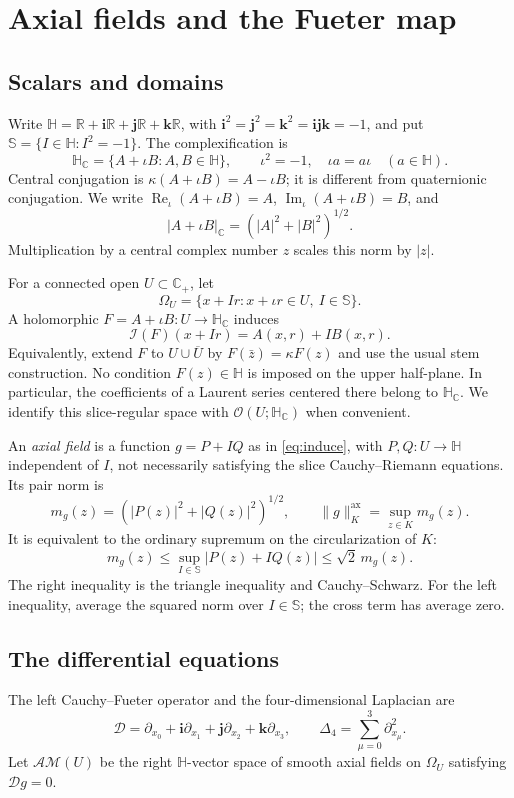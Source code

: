 \documentclass[11pt,a4paper]{article}
\numberwithin{equation}{section}
\theoremstyle{definition}
\theoremstyle{remark}
\newcommand{\R}{\mathbb R}
\newcommand{\C}{\mathbb C}
\newcommand{\HH}{\mathbb H}
\newcommand{\HC}{\mathbb H_{\C}}
\newcommand{\Sp}{\mathbb S}
\newcommand{\Cp}{\C_+}
\newcommand{\ii}{\mathbf i}
\newcommand{\jj}{\mathbf j}
\newcommand{\kk}{\mathbf k}
\newcommand{\D}{\mathcal D}
\newcommand{\Lap}{\Delta_4}
\newcommand{\Ind}{\mathcal I}
\newcommand{\AM}{\mathcal{AM}}
\newcommand{\Hol}{\mathcal O}
\newcommand{\ReC}{\operatorname{Re}_{\iota}}
\newcommand{\ImC}{\operatorname{Im}_{\iota}}
\newcommand{\pairnorm}[1]{\lVert #1\rVert^{\mathrm{ax}}}
\newcommand{\cnorm}[1]{\lvert #1\rvert_{\C}}
\begin{document}
\section{Axial fields and the Fueter map}
\label{sec:setup}

\subsection{Scalars and domains}
Write $\HH=\R+\ii\R+\jj\R+\kk\R$, with
$\ii^2=\jj^2=\kk^2=\ii\jj\kk=-1$, and put
$\Sp=\{I\in\HH:I^2=-1\}$. The complexification is
\[
 \HC=\{A+\iota B:A,B\in\HH\},\qquad \iota^2=-1,
 \quad\iota a=a\iota\quad(a\in\HH).
\]
Central conjugation is $\kappa(A+\iota B)=A-\iota B$; it is different from
quaternionic conjugation. We write $\ReC(A+\iota B)=A$,
$\ImC(A+\iota B)=B$, and
\[
 \cnorm{A+\iota B}=(|A|^2+|B|^2)^{1/2}.
\]
Multiplication by a central complex number $z$ scales this norm by $|z|$.

For a connected open $U\subset\Cp$, let
\[
 \Omega_U=\{x+Ir:x+\iota r\in U,\ I\in\Sp\}.
\]
A holomorphic $F=A+\iota B:U\to\HC$ induces
\begin{equation}\label{eq:induce}
 \Ind(F)(x+Ir)=A(x,r)+IB(x,r).
\end{equation}
Equivalently, extend $F$ to $U\cup\overline U$ by
$F(\bar z)=\kappa F(z)$ and use the usual stem construction. No condition
$F(z)\in\HH$ is imposed on the upper half-plane. In particular, the
coefficients of a Laurent series centered there belong to $\HC$.
We identify this slice-regular space with $\Hol(U;\HC)$ when convenient.

An \emph{axial field} is a function $g=P+IQ$ as in
\eqref{eq:induce}, with $P,Q:U\to\HH$ independent of $I$, not necessarily
satisfying the slice Cauchy--Riemann equations. Its pair norm is
\begin{equation}\label{eq:pairnorm}
 m_g(z)=(|P(z)|^2+|Q(z)|^2)^{1/2},\qquad
 \pairnorm{g}_K=\sup_{z\in K}m_g(z).
\end{equation}
It is equivalent to the ordinary supremum on the circularization of $K$:
\begin{equation}\label{eq:norm-equiv}
 m_g(z)\le \sup_{I\in\Sp}|P(z)+IQ(z)|\le\sqrt2\,m_g(z).
\end{equation}
The right inequality is the triangle inequality and Cauchy--Schwarz. For
the left inequality, average the squared norm over $I\in\Sp$; the cross
term has average zero.

\subsection{The differential equations}
The left Cauchy--Fueter operator and the four-dimensional Laplacian are
\[
 \D=\partial_{x_0}+\ii\partial_{x_1}+\jj\partial_{x_2}+\kk\partial_{x_3},
 \qquad \Lap=\sum_{\mu=0}^3\partial_{x_\mu}^2.
\]
Let $\AM(U)$ be the right $\HH$-vector space of smooth axial fields on
$\Omega_U$ satisfying $\D g=0$.
\end{document}
